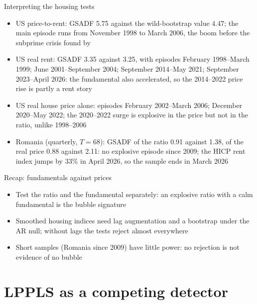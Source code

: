 \begin{frame}{Interpreting the housing tests}
\itemsize{\footnotesize}
\begin{itemize}
    \item US price-to-rent: GSADF 5.75 against the wild-bootstrap value 4.47; the main episode runs from November 1998 to March 2006, the boom before the subprime crisis found by 
    \item US real rent: GSADF 3.35 against 3.25, with episodes February 1998--March 1999; June 2001--September 2004; September 2014--May 2021; September 2023--April 2026: the fundamental also accelerated, so the 2014--2022 price rise is partly a rent story
    \item US real house price alone: episodes February 2002--March 2006; December 2020--May 2022; the 2020--2022 surge is explosive in the price but not in the ratio, unlike 1998--2006
    \item Romania (quarterly, $T = 68$): GSADF of the ratio 0.91 against 1.38, of the real price 0.88 against 2.11: no explosive episode since 2009; the HICP rent index jumps by 33\% in April 2026, so the sample ends in March 2026
\end{itemize}
\end{frame}

\begin{frame}{Recap: fundamentals against prices}
\itemsize{\small}
\begin{itemize}
    \item Test the ratio and the fundamental separately: an explosive ratio with a calm fundamental is the bubble signature
    \item Smoothed housing indices need lag augmentation and a bootstrap under the AR null; without lags the tests reject almost everywhere
    \item Short samples (Romania since 2009) have little power: no rejection is not evidence of no bubble
\end{itemize}
\end{frame}


\section{LPPLS as a competing detector}

